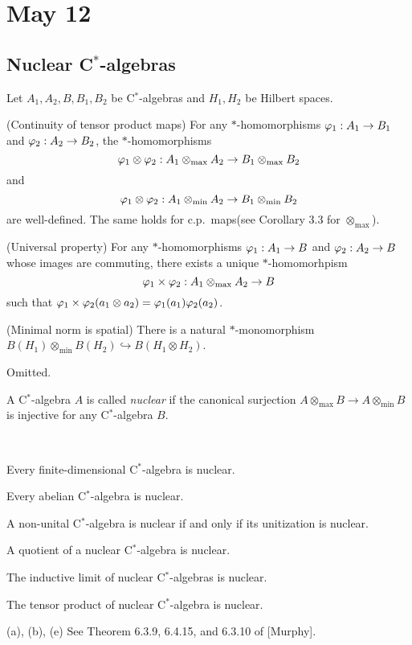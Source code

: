 \documentclass{../../../small}
\begin{document}
% 


\newpage
\section{May 12}



\subsection{Nuclear C$^*$-algebras}

\begin{prop}
Let $A_1, A_2, B, B_1, B_2$ be C$^*$-algebras and $H_1,H_2$ be Hilbert spaces.
\begin{parts}
\item (Continuity of tensor product maps)
For any $*$-homomorphisms $\varphi_1:A_1\to B_1$ and $\varphi_2:A_2\to B_2$, the $*$-homomorphisms
\[\varphi_1\otimes\varphi_2:A_1\otimes_{\max} A_2\to B_1\otimes_{\max} B_2\]
and
\[\varphi_1\otimes\varphi_2:A_1\otimes_{\min} A_2\to B_1\otimes_{\min} B_2\]
are well-defined.
The same holds for c.p.~maps(see Corollary 3.3 for $\otimes_{\max}$).
\item (Universal property)
For any $*$-homomorphisms $\varphi_1:A_1\to B$ and $\varphi_2:A_2\to B$ whose images are commuting, there exists a unique $*$-homomorhpism
\[\varphi_1\times\varphi_2:A_1\otimes_{\max} A_2\to B\]
such that $\varphi_1\times\varphi_2(a_1\otimes a_2)=\varphi_1(a_1)\varphi_2(a_2)$.
\item (Minimal norm is spatial)
There is a natural $*$-monomorphism $B(H_1)\otimes_{\min}B(H_2)\hookrightarrow B(H_1\otimes H_2)$.
\end{parts}
\end{prop}
\begin{pf}
Omitted.
\end{pf}

\begin{defn}
A C$^*$-algebra $A$ is called \emph{nuclear} if the canonical surjection $A\otimes_{\max} B\to A\otimes_{\min} B$ is injective for any C$^*$-algebra $B$.
\end{defn}


\begin{ex}\,
\begin{parts}
\item Every finite-dimensional C$^*$-algebra is nuclear.
\item Every abelian C$^*$-algebra is nuclear.
\item A non-unital C$^*$-algebra is nuclear if and only if its unitization is nuclear.
\item A quotient of a nuclear C$^*$-algebra is nuclear.
\item The inductive limit of nuclear C$^*$-algebras is nuclear.
\item The tensor product of nuclear C$^*$-algebra is nuclear.
\end{parts}
\end{ex}
\begin{pf}
(a), (b), (e) See Theorem 6.3.9, 6.4.15, and 6.3.10 of [Murphy].
\end{pf}
\end{document}
